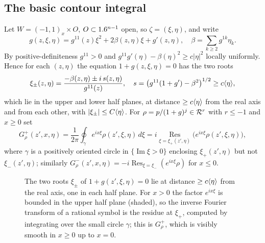 \subsection*{The basic contour integral}
Let $W=(-1,1)_x\times O$, $O\subset1.6^{n-1}$ open, so $\zeta=(\xi,\eta)$, and write
\begin{equation*}
g(z,\xi,\eta)=g^{11}(z)\xi^2+2\beta(z,\eta)\xi+g'(z,\eta),\quad
\beta=\sum_{k\ge2}g^{1k}\eta_k.
\end{equation*}
By positive-definiteness $g^{11}>0$ and $g^{11}g'(\eta)-\beta(\eta)^2\ge c|\eta|^2$
locally uniformly. Hence for each $(z,\eta)$ the equation $1+g(z,\xi,\eta)=0$ has the
two roots
\begin{equation*}
\xi_\pm(z,\eta)=\frac{-\beta(z,\eta)\pm i\,s(z,\eta)}{g^{11}(z)},\quad
s=\big(g^{11}(1+g')-\beta^2\big)^{1/2}\ge c\langle \eta\rangle,
\end{equation*}
which lie in the upper and lower half planes, at distance $\ge c\langle \eta\rangle$ from the
real axis and from each other, with $|\xi_\pm|\le C\langle \eta\rangle$. For $\rho=p/(1+g)^j\in
\mathcal{R}^{r}$ with $r\le-1$ and $x\ge0$ set
\begin{equation}\label{boundary:eq:Gplus}
G^+_\rho(z',x,\eta)=\frac1{2\pi}\oint_{\gamma}e^{ix\xi}\rho(z',\xi,\eta)\,d\xi=
i\operatorname*{Res}_{\xi=\xi_+(z',\eta)}\big(e^{ix\xi}\rho(z',\xi,\eta)\big),
\end{equation}
where $\gamma$ is a positively oriented circle in $\{\operatorname{Im}\xi>0\}$
enclosing $\xi_+(z',\eta)$ but not $\xi_-(z',\eta)$; similarly
$G^-_\rho(z',x,\eta)=-i\operatorname{Res}_{\xi=\xi_-}(e^{ix\xi}\rho)$ for $x\le0$.

\begin{figure}[ht]
  \centering
  \caption{The two roots $\xi_\pm$ of $1+g(z',\xi,\eta)=0$ lie at distance
  $\ge c\langle \eta\rangle$ from the real axis, one in each half plane. For $x>0$ the factor
  $e^{ix\xi}$ is bounded in the upper half plane (shaded), so the inverse Fourier
  transform of a rational symbol is the residue at $\xi_+$, computed by integrating
  over the small circle $\gamma$; this is $G^+_\rho$, which is visibly smooth in
  $x\ge0$ up to $x=0$.}
  \label{boundary:fig:contour}
\end{figure}

